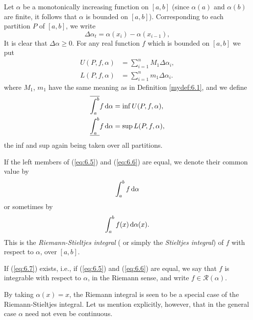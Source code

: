 \begin{mydef}
    \label{mydef:6.2}
    Let $\alpha$ be a monotonically increasing function on $[a, b]$ 
    (since $\alpha (a)$ and $\alpha (b)$ are finite, 
    it follows that $\alpha$ is bounded on $[a, b]$). 
    Corresponding to each partition $P$ of $[a, b]$, 
    we write
    \begin{equation*}
        \Delta \alpha_t = \alpha (x_{i}) - \alpha (x_{i-1}),        
    \end{equation*}
    It is clear that $\Delta \alpha \geq 0$. 
    For any real function $f$ which is bounded on $[a, b]$
    we put
    \begin{align*}
        U(P, f, \alpha) &= \sum_{i=1}^{n} M_1 \Delta \alpha_i, \\
        L(P, f, \alpha) &= \sum_{i=1}^{n} m_1 \Delta \alpha_i. 
    \end{align*}
    where $M_1$, $m_1$ have the same meaning as in Definition \ref{mydef:6.1}, 
    and we define
    \begin{align}
        \label{eq:6.5}
        \overline{\int_{a}^{b}} f \d \alpha &= \inf U(P, f, \alpha), \\
        \label{eq:6.6}
        \underline{\int_{a}^{b}} f \d \alpha &= \sup L(P, f, \alpha),
    \end{align}
    the inf and sup again being taken over all partitions.

    If the left members of (\ref{eq:6.5}) and (\ref{eq:6.6}) are equal, 
    we denote their common value by
    \begin{equation}
        \label{eq:6.7}
        \int_{a}^{b} f \d \alpha
    \end{equation}
    or sometimes by 
    \begin{equation}
        \label{eq:6.8}
        \int_{a}^{b} f(x) \d \alpha (x).
    \end{equation}
    This is the \emph{Riemann-Stieltjes integral} 
    ( or simply the \emph{Stieltjes integral}) of $f$ 
    with respect to $\alpha$, over $[a, b]$.

    If (\ref{eq:6.7}) exists, i.e., 
    if (\ref{eq:6.5}) and (\ref{eq:6.6}) are equal, 
    we say that $f$ is integrable with respect to $\alpha$, 
    in the Riemann sense, and write $f \in \mathscr{R}(\alpha)$.
    
    By taking $\alpha(x) = x$, 
    the Riemann integral is seen to be a special case of
    the Riemann-Stieltjes integral. 
    Let us mention explicitly, however, that in the
    general case $\alpha$ need not even be continuous.


\end{mydef}
